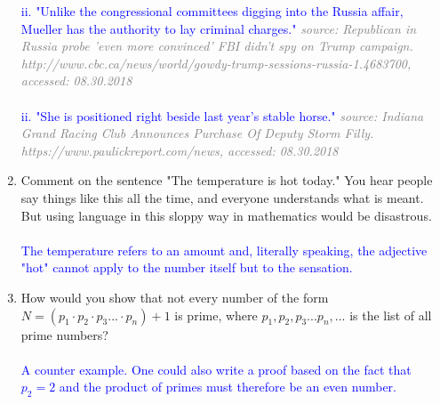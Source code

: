 \documentclass[13.5pt]{article}
\begin{document}
\begin{enumerate}
\textcolor{blue}{ii. "Unlike the congressional committees digging into the Russia affair, Mueller has the authority to lay criminal charges."}
\textcolor{gray}{\textit{source: Republican in Russia probe 'even more convinced' FBI didn't spy on Trump campaign. http://www.cbc.ca/news/world/gowdy-trump-sessions-russia-1.4683700, accessed: 08.30.2018}}\\\\
\textcolor{blue}{ii. "She is positioned right beside last year's stable horse."}
\textcolor{gray}{\textit{source: Indiana Grand Racing Club Announces Purchase Of Deputy Storm Filly. https://www.paulickreport.com/news, accessed: 08.30.2018}}

\item{Comment on the sentence "The temperature is hot today." You hear people say things like this
all the time, and everyone understands what is meant. But using language in this sloppy way in
mathematics would be disastrous.}\\\\
\textcolor{blue}{The temperature refers to an amount and, literally speaking, the adjective "hot" cannot apply to the number itself but to the sensation. }

\item{How would you show that not every number of the form \(N=(p_1 \cdot p_2 \cdot p_3 ... \cdot p_n) + 1\)  is prime, where \(p_1,p_2,p_3...p_n,...\)  is the list of all prime numbers?}\\\\
\textcolor{blue}{A counter example. One could also write a proof based on the fact that \(p_2=2\) and the product of primes must therefore be an even number. }


\end{enumerate}
\end{document}
